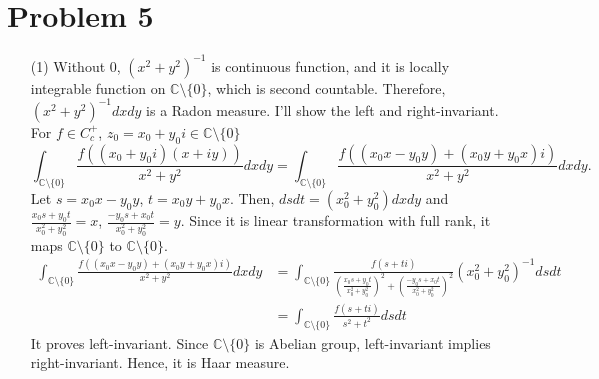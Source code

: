 \documentclass{article}
\begin{document}
\section*{Problem 5}
\begin{enumerate}
\item[(1)] Without $0$, $(x^2+y^2)^{-1}$ is continuous function, and it is locally integrable function on $\mathbb{C}\setminus\{0\}$, which is second countable. Therefore, $(x^2+y^2)^{-1}dxdy$ is a Radon measure.
I'll show the left and right-invariant. For $f\in C_c^+$, $z_0=x_0+y_0i\in \mathbb{C}\setminus\{0\}$
\begin{equation*}
\int_{\mathbb{C}\setminus\{0\}} \frac{f((x_0+y_0i)(x+iy))}{x^2+y^2}dxdy=\int_{\mathbb{C}\setminus\{0\}} \frac{f((x_0x-y_0y)+(x_0y+y_0x)i)}{x^2+y^2}dxdy.
\end{equation*}
Let $s=x_0x-y_0y$, $t=x_0y+y_0x$. Then, $dsdt=(x_0^2+y_0^2)dxdy$ and $\frac{x_0s+y_0 t}{x_0^2+y_0^2}=x$, $\frac{-y_0s+x_0t}{x_0^2+y_0^2}=y$. Since it is linear transformation with full rank, it maps $\mathbb{C}\setminus\{0\}$ to $\mathbb{C}\setminus\{0\}$.
\begin{equation*}
\begin{split}
\int_{\mathbb{C}\setminus\{0\}} \frac{f((x_0x-y_0y)+(x_0y+y_0x)i)}{x^2+y^2}dxdy&=\int_{\mathbb{C}\setminus\{0\}} \frac{f(s+ti)}{\left(\frac{x_0s+y_0 t}{x_0^2+y_0^2}\right)^2+\left(\frac{-y_0s+x_0t}{x_0^2+y_0^2}\right)^2}(x_0^2+y_0^2)^{-1}dsdt \\
&=\int_{\mathbb{C}\setminus\{0\}} \frac{f(s+ti)}{s^2+t^2}dsdt
\end{split}
\end{equation*}
It proves left-invariant. Since $\mathbb{C}\setminus\{0\}$ is Abelian group, left-invariant implies right-invariant. Hence, it is Haar measure.



\end{enumerate}
\end{document}
